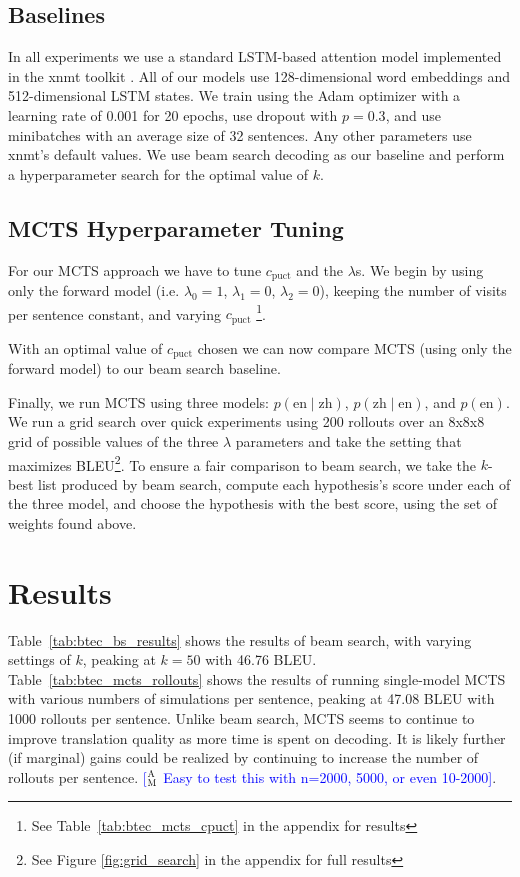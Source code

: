 \documentclass[11pt,a4paper]{article}
\newcommand{\ensuretext}[1]{#1}
\newcommand{\mycomment}[3]{\ensuretext{\textcolor{#3}{[#1 #2]}}}
\newcommand{\ammarker}{\ensuretext{\textcolor{blue}{\ensuremath{^{\textsc{A}}_{\textsc{M}}}}}}
\newcommand{\am}[1]{\mycomment{\ammarker}{#1}{blue}}
\begin{document}
\subsection{Baselines}
In all experiments we use a standard LSTM-based attention model
\cite{bahdanau2014neural} implemented in the xnmt toolkit
\cite{neubig2018xnmt}. All of our models use 128-dimensional word embeddings
and 512-dimensional LSTM states. We train using the Adam optimizer
\cite{kingma2014adam} with a learning rate of 0.001 for 20 epochs, use dropout
\cite{srivastava2014dropout} with $p=0.3$, and use minibatches with an average
size of 32 sentences. Any other parameters use xnmt's default values. We use
beam search decoding as our baseline and perform a hyperparameter search for
the optimal value of $k$.

\subsection{MCTS Hyperparameter Tuning}
For our MCTS approach we have to tune $c_\text{puct}$ and the $\lambda$s. We
begin by using only the forward model (i.e. $\lambda_0=1$, $\lambda_1=0$,
$\lambda_2=0$), keeping the number of visits per sentence constant, and varying
$c_\text{puct}$ \footnote{See Table~\ref{tab:btec_mcts_cpuct} in the appendix
for results}.

With an optimal value of $c_\text{puct}$ chosen we can now compare MCTS (using
only the forward model) to our beam search baseline.

Finally, we run MCTS using three models: $p(\text{en}\mid\text{zh})$,
$p(\text{zh}\mid\text{en})$, and $p(\text{en})$. We run a grid search over
quick experiments using 200 rollouts over an 8x8x8 grid of possible values of
the three $\lambda$ parameters and take the setting that maximizes
BLEU\footnote{See Figure \ref{fig:grid_search} in the appendix for full
results}. To ensure a fair comparison to beam search, we take the $k$-best list
produced by beam search, compute each hypothesis's score under each of the
three model, and choose the hypothesis with the best score, using the set of
weights found above.

\section{Results}
\label{sec:results}
Table~\ref{tab:btec_bs_results} shows the results of beam search, with varying
settings of $k$, peaking at $k=50$ with 46.76 BLEU.
Table~\ref{tab:btec_mcts_rollouts} shows the results of running single-model
MCTS with various numbers of simulations per sentence, peaking at 47.08 BLEU
with 1000 rollouts per sentence. Unlike beam search, MCTS seems to continue to
improve translation quality as more time is spent on decoding. It is likely
further (if marginal) gains could be realized by continuing to increase the
number of rollouts per sentence. \am{Easy to test this with n=2000, 5000, or
even 10-2000}.
\end{document}
